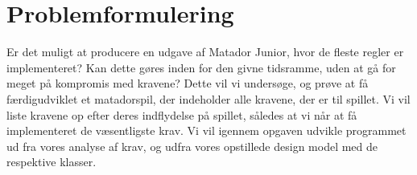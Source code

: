 \chapter{Problemformulering}
Er det muligt at producere en udgave af Matador Junior, hvor de fleste regler er implementeret? Kan dette gøres inden for den givne tidsramme, uden at gå for meget på kompromis med kravene? Dette vil vi undersøge, og prøve at få færdigudviklet et matadorspil, der indeholder alle kravene, der er til spillet. Vi vil liste kravene op efter deres indflydelse på spillet, således at vi når at få implementeret de væsentligste krav. Vi vil igennem opgaven udvikle programmet ud fra vores analyse af krav, og udfra vores opstillede design model med de respektive klasser.
